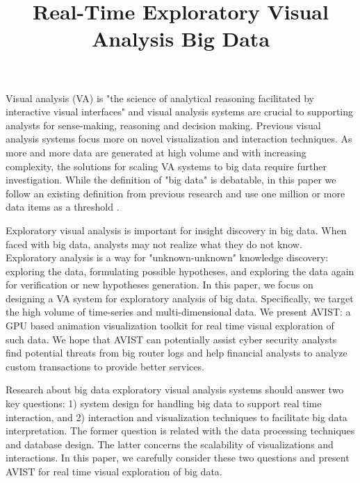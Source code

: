 \documentclass[journal]{vgtc}                %
\title{Real-Time Exploratory Visual Analysis Big Data }
\begin{document}


\maketitle

Visual analysis (VA) is "the science of analytical reasoning facilitated by interactive visual interfaces" \cite{Thomas2005} and visual analysis systems are crucial to supporting analysts for sense-making, reasoning and decision making. Previous visual analysis systems focus more on novel visualization and interaction techniques. As more and more data are generated at high volume and with increasing complexity, the solutions for scaling VA systems to big data require further investigation\cite{Zhang2012}. While the definition of "big data" is debatable, in this paper we follow an existing definition from previous research and use one million or more data items as a threshold \cite{2013-immens}.
     
Exploratory visual analysis is important for insight discovery in big data. When faced with big data, analysts may not realize what they do not know. Exploratory analysis is a way for "unknown-unknown" knowledge discovery: exploring the data, formulating possible hypotheses, and exploring the data again for verification or new hypotheses generation. In this paper, we focus on designing a VA system for exploratory analysis of big data. Specifically, we target the high volume of time-series and multi-dimensional data. We present AVIST: a GPU based animation visualization toolkit for real time visual exploration of such data. We hope that AVIST can potentially assist cyber security analysts  find potential threats from big router logs and help financial analysts to analyze custom transactions to provide better services.

Research about big data exploratory visual analysis systems should answer two key questions: 1) system design for handling big data to support real time interaction, and 2) interaction and visualization techniques to facilitate big data interpretation. The former question is related with the data processing techniques and database design. The latter concerns the scalability of visualizations and interactions. In this paper, we carefully consider these two questions and present AVIST for real time visual exploration of big data.
\end{document}
